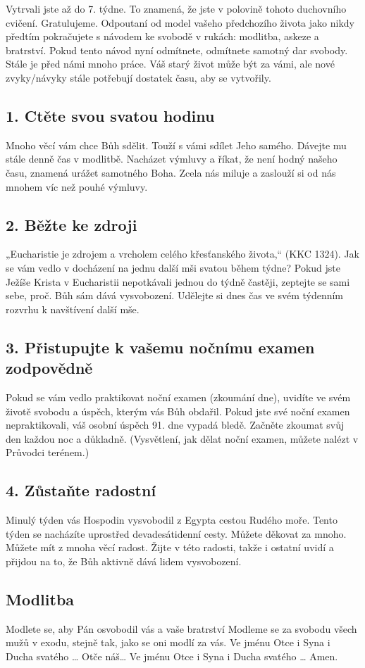 \documentclass[11pt]{article}
\begin{document}
Vytrvali jste až do 7. týdne. To znamená, že jste v polovině tohoto duchovního cvičení. Gratulujeme. Odpoutaní
od model vašeho předchozího života jako nikdy předtím pokračujete s návodem ke svobodě v rukách: modlitba,
askeze a bratrství. Pokud tento návod nyní odmítnete, odmítnete samotný dar svobody. Stále je před námi
mnoho práce. Váš starý život může být za vámi, ale nové zvyky/návyky stále potřebují dostatek času, aby se
vytvořily.
\subsection*{1. Ctěte svou svatou hodinu}
Mnoho věcí vám chce Bůh sdělit. Touží s vámi sdílet Jeho samého. Dávejte mu stále denně čas v modlitbě. Nacházet výmluvy a říkat, že není hodný našeho času, znamená urážet samotného Boha. Zcela nás miluje a zaslouží si od nás mnohem víc než pouhé výmluvy.
\subsection*{2. Běžte ke zdroji}
„Eucharistie je zdrojem a vrcholem celého křesťanského života,“ (KKC 1324). Jak se vám vedlo v docházení na jednu další mši svatou během týdne? Pokud jste Ježíše Krista v Eucharistii nepotkávali jednou do týdně častěji, zeptejte se sami sebe, proč. Bůh sám dává vysvobození. Udělejte si dnes čas ve svém týdenním rozvrhu k navštívení další mše.
\subsection*{3. Přistupujte k vašemu nočnímu examen zodpovědně}
Pokud se vám vedlo praktikovat noční examen (zkoumání dne), uvidíte ve svém životě svobodu a úspěch, kterým vás Bůh obdařil. Pokud jste své noční examen nepraktikovali, váš osobní úspěch 91. dne vypadá bledě. Začněte zkoumat svůj den každou noc a důkladně. (Vysvětlení, jak dělat noční examen, můžete nalézt v Průvodci terénem.)
\subsection*{4. Zůstaňte radostní}
Minulý týden vás Hospodin vysvobodil z Egypta cestou Rudého moře. Tento týden se nacházíte uprostřed devadesátidenní cesty. Můžete děkovat za mnoho. Můžete mít z mnoha věcí radost. Žijte v této radosti, takže i ostatní uvidí a přijdou na to, že Bůh aktivně dává lidem vysvobození.

\subsection*{Modlitba}
Modlete se, aby Pán osvobodil vás a vaše bratrství \newline
Modleme se za svobodu všech mužů v exodu, stejně tak, jako se oni modlí za vás.\newline
Ve jménu Otce i Syna i Ducha svatého … Otče náš… Ve jménu Otce i Syna i Ducha svatého … Amen.
\newpage
\end{document}
